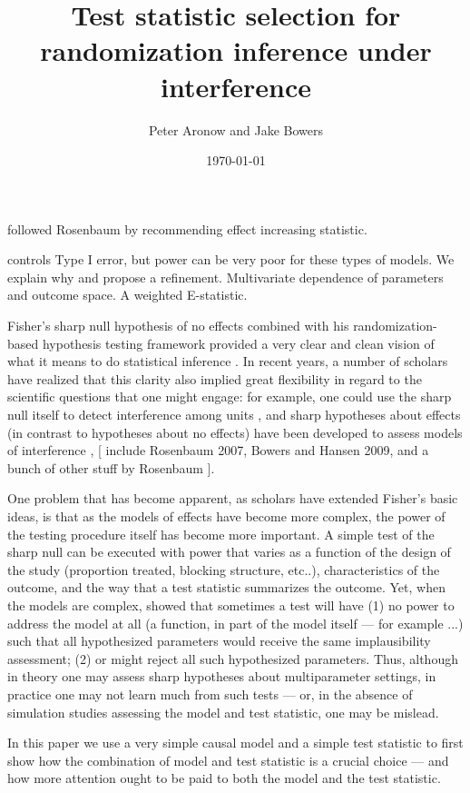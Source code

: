 \documentclass[12pt]{article}
\title{Test statistic selection for randomization inference under interference}
\author{Peter Aronow and Jake Bowers}
\date{\today}
\begin{document}
\maketitle


 \citep{bowers2013sutva} followed Rosenbaum by recommending effect increasing
 statistic.

 controls Type I error, but power can be very poor for these types of models.
 We explain why and propose a refinement. Multivariate dependence of
 parameters and outcome space. A weighted E-statistic. 

Fisher's sharp null hypothesis of no effects combined with his
randomization-based hypothesis testing framework provided a very clear and
clean vision of what it means to do statistical inference \citep[Chap
2]{fisher:1935}. In recent years, a number of scholars have realized that this
clarity also implied great flexibility in regard to the scientific questions
that one might engage: for example, one could use the sharp null itself to
detect interference among units \citep{aronow-general}, and sharp hypotheses
about effects (in contrast to hypotheses about no effects) have been developed
to assess models of interference \citep{bowers2013sutva}, [ include Rosenbaum
2007, Bowers and Hansen 2009, and a bunch of other stuff by Rosenbaum ].

One problem that has become apparent, as scholars have extended Fisher's basic
ideas, is that as the models of effects have become more complex, the power of
the testing procedure itself has become more important. A simple test of the
sharp null can be executed with power that varies as a function of the design
of the study (proportion treated, blocking structure, etc..), characteristics
of the outcome, and the way that a test statistic summarizes the outcome. Yet,
when the models are complex,  \citet{bowers2013sutva} showed that sometimes a
test will have (1) no power to address the model at all (a function, in part
of the model itself --- for example ...) such that all hypothesized parameters
would receive the same implausibility assessment; (2) or might reject all such
hypothesized parameters. Thus, although in theory one may assess sharp
hypotheses about multiparameter settings, in practice one may not learn much
from such tests --- or, in the absence of simulation studies assessing the
model and test statistic, one may be mislead.  

In this paper we use a very simple causal model and a simple test statistic to
first show how the combination of model and test statistic is a crucial choice
--- and how more attention ought to be paid to both the model and the test
statistic.
\end{document}

